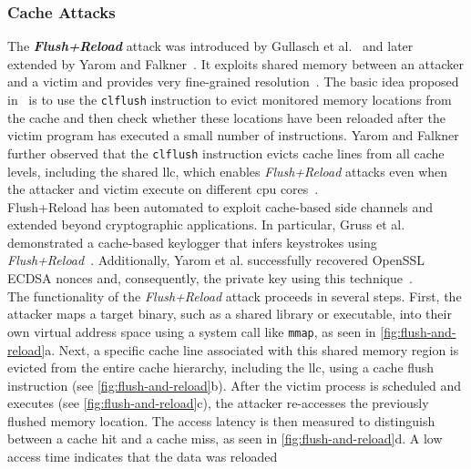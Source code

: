     \subsubsection{Cache Attacks} \label{subsubsec:cache-attacks}
        The \textbf{\textit{Flush+Reload}} attack was introduced by Gullasch et al.~\cite{paperCacheGames} and later extended by
        Yarom and Falkner~\cite{paperFlushReload}. It exploits shared memory between an attacker and a victim and provides very 
        fine-grained resolution~\cite{thesisMicroAttacks, paperRowhammerjs}. The basic idea proposed in~\cite{paperCacheGames} is 
        to use the \texttt{clflush} instruction to evict monitored memory locations from the cache and then 
        check whether these locations have been reloaded after the victim program has executed a small number of 
        instructions. Yarom and Falkner~\cite{paperFlushReload} further observed that the \texttt{clflush} instruction evicts cache 
        lines from all cache levels, including the shared \gls{llc}, which enables \textit{Flush+Reload} 
        attacks even when the attacker and victim execute on different \gls{cpu} cores~\cite{thesisCacheAttacksandRH}.
        \\
        Flush+Reload has been automated to exploit cache-based side channels and extended beyond cryptographic 
        applications. In particular, Gruss et al. demonstrated a cache-based keylogger that infers keystrokes 
        using \textit{Flush+Reload}~\cite{paperCacheTemplateAttacks}. Additionally, Yarom et al. successfully recovered OpenSSL ECDSA nonces and, 
        consequently, the private key using this technique~\cite{paperECDSA}.
        \\
        The functionality of the \textit{Flush+Reload} attack proceeds in several steps. First, the attacker maps a target 
        binary, such as a shared library or executable, into their own virtual address space using a system call 
        like \texttt{mmap}, as seen in \cref{fig:flush-and-reload}a. Next, a specific cache line associated 
        with this shared memory region is evicted from the entire cache hierarchy, including the \gls{llc}, using a cache 
        flush instruction (see \cref{fig:flush-and-reload}b). After the victim process is 
        scheduled and executes (see \cref{fig:flush-and-reload}c), the attacker re-accesses the previously 
        flushed memory location. The access latency is then measured to distinguish between a cache hit and a cache 
        miss, as seen in \cref{fig:flush-and-reload}d. A low access time indicates that the data was reloaded 
